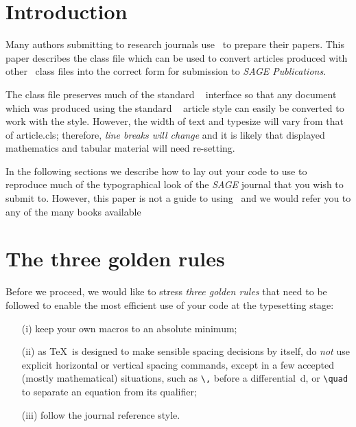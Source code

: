 \documentclass[Afour,sageh,times]{includes/tex/sagej}
\begin{document}
\maketitle


\section{Introduction}

Many authors submitting to research journals use \LaTeXe~to prepare
their papers. This paper describes the \textsf{\journalclass} class file
which can be used to convert articles produced with other \LaTeXe~class
files into the correct form for submission to
\textit{SAGE Publications}.

The \textsf{\journalclass} class file preserves much of the standard
\LaTeXe~ interface so that any document which was produced using the
standard \LaTeXe~ \textsf{article} style can easily be converted to work
with the \textsf{\journalclassshort} style. However, the width of text
and typesize will vary from that of \textsf{article.cls}; therefore,
\textit{line breaks 
will change} and it is likely that displayed mathematics and tabular
material will need re-setting.

In the following sections we describe how to lay out your code to use
\textsf{\journalclass} to reproduce much of the typographical look of
the \textit{SAGE} journal that you wish to submit to. However, this
paper is not a guide to using \LaTeXe~and we would refer you to any of
the many books available
\citep[see, for example,][]{kopka_daly_2003, lamport_1994, mittlebach_goossens_2004}

\section{The three golden rules}

Before we proceed, we would like to stress \textit{three golden rules}
that need to be followed to enable the most efficient use of your code
at the typesetting stage:

\begin{enumerate}
  \item[(i)] keep your own macros to an absolute minimum;
  \item[(ii)] as \TeX\ is designed to make sensible spacing decisions by 
  itself, do \textit{not} use explicit horizontal or vertical spacing 
  commands, except in a few accepted (mostly mathematical) situations, such as 
  \verb"\," before a differential~d, or \verb"\quad" to separate an equation 
  from its qualifier;
  \item[(iii)] follow the journal reference style.
\end{enumerate}
\end{document}
